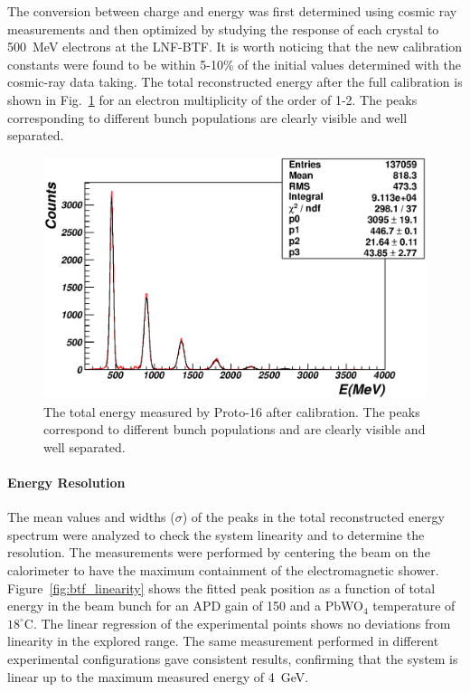 The conversion between charge and energy was first determined using cosmic ray measurements and then optimized
by studying the response of each crystal to 500~MeV electrons at the LNF-BTF. It is worth noticing that the new
calibration constants were found to be within 5-10\% of the initial values determined with the cosmic-ray data
taking. The total reconstructed energy  after the full calibration is shown in Fig.~\ref{fig:btf_etot} for an electron
multiplicity of the order of 1-2. The peaks corresponding to different bunch populations are clearly visible and well
separated. 

\begin{figure}
\includegraphics[width=1.0\columnwidth]{./fig/btf_etot_1876_2_6.eps}
\caption{The total energy measured by Proto-16 after calibration. The peaks correspond to different bunch
  populations and are clearly visible and well separated.}
\label{fig:btf_etot}
\end{figure}

\paragraph{Energy Resolution}

The mean values and widths ($\sigma$) of the peaks in the total reconstructed energy spectrum were analyzed to
check the system linearity and to determine the resolution. The measurements were performed by centering the
beam on the calorimeter to have the maximum containment of the electromagnetic shower.
Figure~\ref{fig:btf_linearity} shows the fitted peak position as a function of total energy in the beam bunch for an
APD gain of 150 and a PbWO$_4$ temperature of $18^{\circ}$C. The linear regression of the experimental points
shows no deviations from linearity in the explored range. The same measurement performed in different experimental
configurations gave consistent results, confirming that the system is linear up to the maximum measured energy of
4~GeV.

